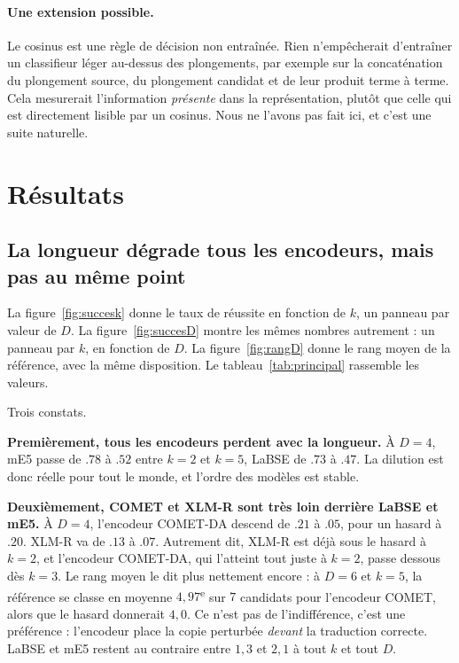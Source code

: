 \documentclass[11pt]{article}
\begin{document}
\paragraph{Une extension possible.}
Le cosinus est une règle de décision non entraînée.
Rien n'empêcherait d'entraîner un classifieur léger au-dessus des plongements, par exemple sur la concaténation du plongement source, du plongement candidat et de leur produit terme à terme.
Cela mesurerait l'information \emph{présente} dans la représentation, plutôt que celle qui est directement lisible par un cosinus.
Nous ne l'avons pas fait ici, et c'est une suite naturelle.

\section{Résultats}

\subsection{La longueur dégrade tous les encodeurs, mais pas au même point}

La figure~\ref{fig:succesk} donne le taux de réussite en fonction de $k$, un panneau par valeur de $D$.
La figure~\ref{fig:succesD} montre les mêmes nombres autrement : un panneau par $k$, en fonction de $D$.
La figure~\ref{fig:rangD} donne le rang moyen de la référence, avec la même disposition.
Le tableau~\ref{tab:principal} rassemble les valeurs.

Trois constats.

\textbf{Premièrement, tous les encodeurs perdent avec la longueur.}
À $D=4$, mE5 passe de $.78$ à $.52$ entre $k=2$ et $k=5$, LaBSE de $.73$ à $.47$.
La dilution est donc réelle pour tout le monde, et l'ordre des modèles est stable.

\textbf{Deuxièmement, COMET et XLM-R sont très loin derrière LaBSE et mE5.}
À $D=4$, l'encodeur COMET-DA descend de $.21$ à $.05$, pour un hasard à $.20$.
XLM-R va de $.13$ à $.07$.
Autrement dit, XLM-R est déjà sous le hasard à $k=2$, et l'encodeur COMET-DA, qui l'atteint tout juste à $k=2$, passe dessous dès $k=3$.
Le rang moyen le dit plus nettement encore : à $D=6$ et $k=5$, la référence se classe en moyenne $4{,}97$\textsuperscript{e} sur $7$ candidats pour l'encodeur COMET, alors que le hasard donnerait $4{,}0$.
Ce n'est pas de l'indifférence, c'est une préférence : l'encodeur place la copie perturbée \emph{devant} la traduction correcte.
LaBSE et mE5 restent au contraire entre $1{,}3$ et $2{,}1$ à tout $k$ et tout $D$.
\end{document}
